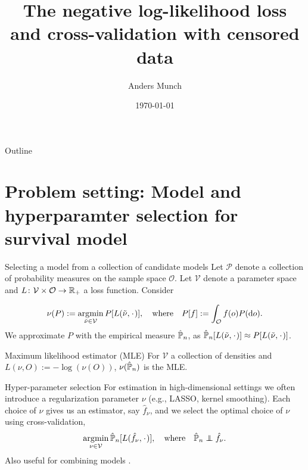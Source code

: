 \documentclass[smaller]{beamer}\usepackage{listings}
\institute{PhD Student, Section of Biostatistics \\ University of Copenhagen}
\author{Anders Munch}
\date{\today}
\title{The negative log-likelihood loss and cross-validation with censored data}
\begin{document}
\maketitle
\begin{frame}{Outline}
\tableofcontents
\end{frame}

\section{Problem setting: Model and hyperparamter selection for survival model}
\label{sec:orgfbb9f88}
\begin{frame}[label={sec:orgf50e91a}]{Selecting a model from a collection of candidate models}
\small Let \(\mathcal{P}\) denote a collection of probability measures on the sample space
\(\mathcal{O}\). Let \(\mathcal{V}\) denote a parameter space and \(L\colon\mathcal{V} \times \mathcal{O}
\rightarrow \mathbb{R}_+\) a loss function. Consider

\begin{equation*}
  \nu(P) := \argmin_{\tilde{\nu}\in\mathcal{V}} P[L(\tilde{\nu}, \blank)],
  \quad \text{where} \quad
  P[f] := \int_{\mathcal{O}}f(o) P(\diff o). 
\end{equation*}
We approximate $P$ with the empirical measure $\hat{\mathbb{P}}_n$, as
$\empmeas[L(\tilde{\nu}, \blank)] \approx P[L(\tilde{\nu}, \blank)]$.

\begin{exampleblock}{Maximum likelihood estimator (MLE)}
For \(\mathcal{V}\) a collection of densities and \(L(\nu,O) := -\log(\nu(O))\), \(\nu(\hat{\mathbb{P}}_n)\) is
the MLE.
\end{exampleblock}

\begin{exampleblock}{Hyper-parameter selection}
For estimation in high-dimensional settings we often introduce a regularization parameter \(\nu\)
(e.g., LASSO, kernel smoothing). Each choice of \(\nu\) gives us an estimator, say \(\hat f_{\nu}\), and
we select the optimal choice of \(\nu\) using cross-validation,
\begin{equation*}
  \argmin_{\nu\in\mathcal{V}} \empmeas[L(\hat{f}_{\nu}, \blank)],
  \quad \text{where} \quad
  \empmeas \independent \hat{f}_{\nu}.
\end{equation*}
Also useful for combining models \citep{breiman1996stacked,van2007super}.
\end{exampleblock}
\end{frame}
\end{document}
